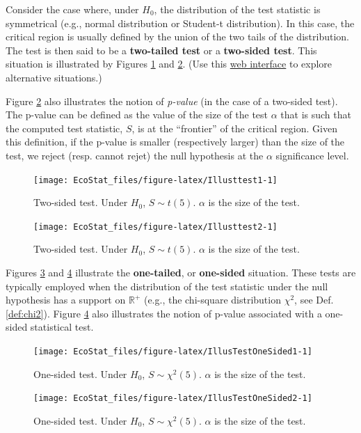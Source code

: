 \documentclass[
  12pt,
]{book}
\theoremstyle{definition}
\theoremstyle{definition}
\theoremstyle{definition}
\theoremstyle{definition}
\theoremstyle{remark}
\begin{document}
Consider the case where, under \(H_0\), the distribution of the test statistic is symmetrical (e.g., normal distribution or Student-t distribution). In this case, the critical region is usually defined by the union of the two tails of the distribution. The test is then said to be a \textbf{two-tailed test} or a \textbf{two-sided test}. This situation is illustrated by Figures \ref{fig:Illusttest1} and \ref{fig:Illusttest2}. (Use this \href{https://jrenne.shinyapps.io/tests/}{web interface} to explore alternative situations.)

Figure \ref{fig:Illusttest2} also illustrates the notion of \emph{p-value} (in the case of a two-sided test). The p-value can be defined as the value of the size of the test \(\alpha\) that is such that the computed test statistic, \(S\), is at the ``frontier'' of the critical region. Given this definition, if the p-value is smaller (respectively larger) than the size of the test, we reject (resp. cannot rejet) the null hypothesis at the \(\alpha\) significance level.

\begin{figure}
\texttt{[image: EcoStat\_files/figure-latex/Illusttest1-1]} \caption{Two-sided test. Under $H_0$, $S \sim t(5)$. $\alpha$ is the size of the test.}\label{fig:Illusttest1}
\end{figure}

\begin{figure}
\texttt{[image: EcoStat\_files/figure-latex/Illusttest2-1]} \caption{Two-sided test. Under $H_0$, $S \sim t(5)$. $\alpha$ is the size of the test.}\label{fig:Illusttest2}
\end{figure}

Figures \ref{fig:IllusTestOneSided1} and \ref{fig:IllusTestOneSided2} illustrate the \textbf{one-tailed}, or \textbf{one-sided} situation. These tests are typically employed when the distribution of the test statistic under the null hypothesis has a support on \(\mathbb{R}^+\) (e.g., the chi-square distribution \(\chi^2\), see Def. \ref{def:chi2}). Figure \ref{fig:IllusTestOneSided2} also illustrates the notion of p-value associated with a one-sided statistical test.

\begin{figure}
\texttt{[image: EcoStat\_files/figure-latex/IllusTestOneSided1-1]} \caption{One-sided test. Under $H_0$, $S \sim \chi^2(5)$. $\alpha$ is the size of the test.}\label{fig:IllusTestOneSided1}
\end{figure}

\begin{figure}
\texttt{[image: EcoStat\_files/figure-latex/IllusTestOneSided2-1]} \caption{One-sided test. Under $H_0$, $S \sim \chi^2(5)$. $\alpha$ is the size of the test.}\label{fig:IllusTestOneSided2}
\end{figure}
\end{document}

